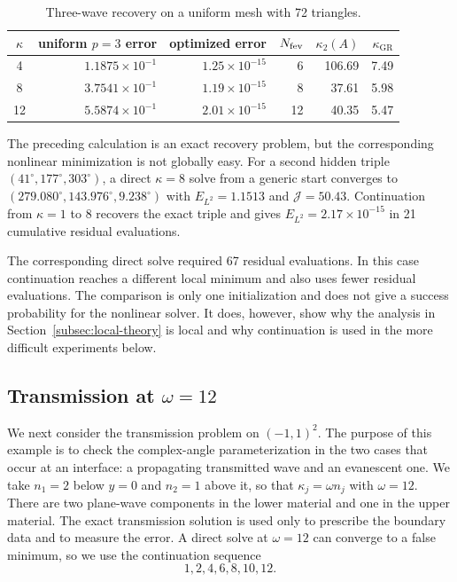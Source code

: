 \documentclass[pdflatex,sn-mathphys-num]{sn-jnl}
\theoremstyle{thmstyleone}
\theoremstyle{thmstyletwo}
\newcommand{\GR}{\mathrm{GR}}
\begin{document}
\begin{table}[htbp]
\centering
\caption{Three-wave recovery on a uniform mesh with 72 triangles.}
\label{tab:threewave}
\begin{tabular}{|c|r|r|r|r|r|}
\hline
$\kappa$ & uniform $p=3$ error & optimized error & $N_{\rm fev}$ & $\kappa_2(A)$ & $\kappa_{\GR}$\\
\hline
4  & $1.1875\times10^{-1}$ & $1.25\times10^{-15}$ & 6  & 106.69 & 7.49\\
8  & $3.7541\times10^{-1}$ & $1.19\times10^{-15}$ & 8  & 37.61  & 5.98\\
12 & $5.5874\times10^{-1}$ & $2.01\times10^{-15}$ & 12 & 40.35  & 5.47\\
\hline
\end{tabular}
\end{table}

The preceding calculation is an exact recovery problem, but the corresponding nonlinear minimization is not globally easy.  For a second hidden triple $(41^\circ,177^\circ,303^\circ)$, a direct $\kappa=8$ solve from a generic start converges to $(279.080^\circ,143.976^\circ,9.238^\circ)$ with $E_{L^2}=1.1513$ and $\mathcal J=50.43$.  Continuation from $\kappa=1$ to $8$ recovers the exact triple and gives $E_{L^2}=2.17\times10^{-15}$ in 21 cumulative residual evaluations.

The corresponding direct solve required 67 residual evaluations.  In this case continuation reaches a different local minimum and also uses fewer residual evaluations.  The comparison is only one initialization and does not give a success probability for the nonlinear solver.  It does, however, show why the analysis in Section~\ref{subsec:local-theory} is local and why continuation is used in the more difficult experiments below.

\subsection{Transmission at \texorpdfstring{$\omega=12$}{omega=12}}\label{subsec:transmission}
We next consider the transmission problem on $(-1,1)^2$.  The purpose of this example is to check the complex-angle parameterization in the two cases that occur at an interface: a propagating transmitted wave and an evanescent one.  We take $n_1=2$ below $y=0$ and $n_2=1$ above it, so that $\kappa_j=\omega n_j$ with $\omega=12$.  There are two plane-wave components in the lower material and one in the upper material.  The exact transmission solution is used only to prescribe the boundary data and to measure the error.  A direct solve at $\omega=12$ can converge to a false minimum, so we use the continuation sequence
\[
 1,2,4,6,8,10,12.
\]
\end{document}
